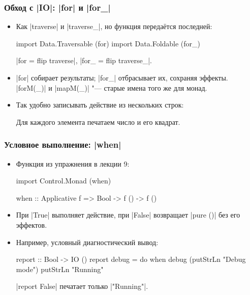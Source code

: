 \documentclass[11pt]{beamer}
\begin{document}
\begin{frame}[fragile]
  \frametitle{Обход с \haskinline|IO|: \haskinline|for| и \haskinline|for_|}
  \begin{itemize}
    \item Как \haskinline|traverse| и \haskinline|traverse_|, но функция передаётся последней:
          \begin{haskellsmall}
            import Data.Traversable (for)
            import Data.Foldable (for_)
          \end{haskellsmall}
          \haskinline|for = flip traverse|, \haskinline|for_ = flip traverse_|.
    \item \haskinline|for| собирает результаты; \haskinline|for_| отбрасывает их, сохраняя эффекты. \haskinline|forM(_)| и \haskinline|mapM(_)| "--- старые имена того же для монад.
          \pause
    \item Так удобно записывать действие из нескольких строк:
          Для каждого элемента печатаем число и его квадрат.
  \end{itemize}
\end{frame}

\begin{frame}[fragile]
  \frametitle{Условное выполнение: \haskinline|when|}
  \begin{itemize}
    \item Функция из упражнения в лекции 9:
          \begin{haskellsmall}
            import Control.Monad (when)

            when :: Applicative f => Bool -> f () -> f ()
          \end{haskellsmall}
    \item При \haskinline|True| выполняет действие, при \haskinline|False| возвращает \haskinline|pure ()| без его эффектов.
          \pause
    \item Например, условный диагностический вывод:
          \begin{haskellsmall}
            report :: Bool -> IO ()
            report debug = do
              when debug (putStrLn "Debug mode")
              putStrLn "Running"
          \end{haskellsmall}
          \haskinline|report False| печатает только \haskinline|"Running"|.
  \end{itemize}
\end{frame}
\end{document}
